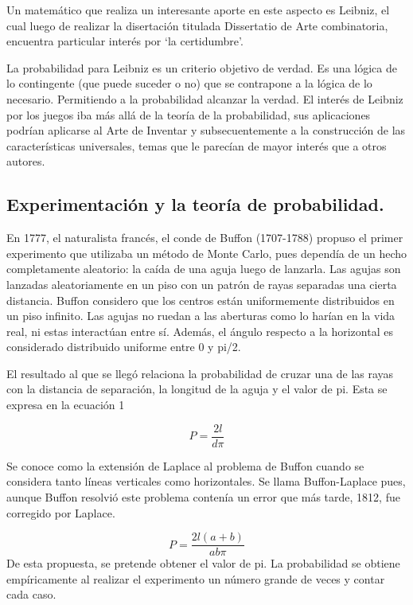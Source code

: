 \documentclass{rbf}
\begin{document}
Un matemático que realiza un interesante aporte en este aspecto es Leibniz, el cual luego de realizar la disertación titulada Dissertatio de Arte combinatoria, encuentra particular interés por ‘la certidumbre’.

La probabilidad para Leibniz es un criterio objetivo de verdad. Es una lógica de lo contingente (que puede suceder o no) que se contrapone a la lógica de lo necesario. Permitiendo a la probabilidad alcanzar la verdad. El interés de Leibniz por los juegos iba más allá de la teoría de la probabilidad, sus aplicaciones podrían aplicarse al Arte de Inventar y subsecuentemente a la construcción de las características universales, temas que le parecían de mayor interés que a otros autores.\cite{Charles}
\subsection{Experimentación y la teoría de probabilidad.}
En 1777, el naturalista francés, el conde de Buffon (1707-1788) propuso el primer experimento que utilizaba un método de Monte Carlo, pues dependía de un hecho completamente aleatorio: la caída de una aguja luego de lanzarla. Las agujas son lanzadas aleatoriamente en un piso con un patrón de rayas separadas una cierta distancia. Buffon considero que los centros están uniformemente distribuidos en un piso infinito. Las agujas no ruedan a las aberturas como lo harían en la vida real, ni estas interactúan entre sí. Además, el ángulo respecto a la horizontal es considerado distribuido uniforme entre 0 y pi/2.

El resultado al que se llegó relaciona la probabilidad de cruzar una de las rayas con la distancia de separación, la longitud de la aguja y el valor de pi. Esta se expresa en la ecuación 1

\begin{equation}
    P=\frac{2l}{d\pi}
\end{equation}

Se conoce como la extensión de Laplace al problema de Buffon cuando se considera tanto líneas verticales como horizontales. Se llama Buffon-Laplace pues, aunque Buffon resolvió este problema contenía un error que más tarde, 1812, fue corregido por Laplace.

\begin{equation}
    P=\frac{2l(a+b)}{ab\pi}
\end{equation}
De esta propuesta, se pretende obtener el valor de pi. La probabilidad se obtiene empíricamente al realizar el experimento un número grande de veces y contar cada caso.
\end{document}
